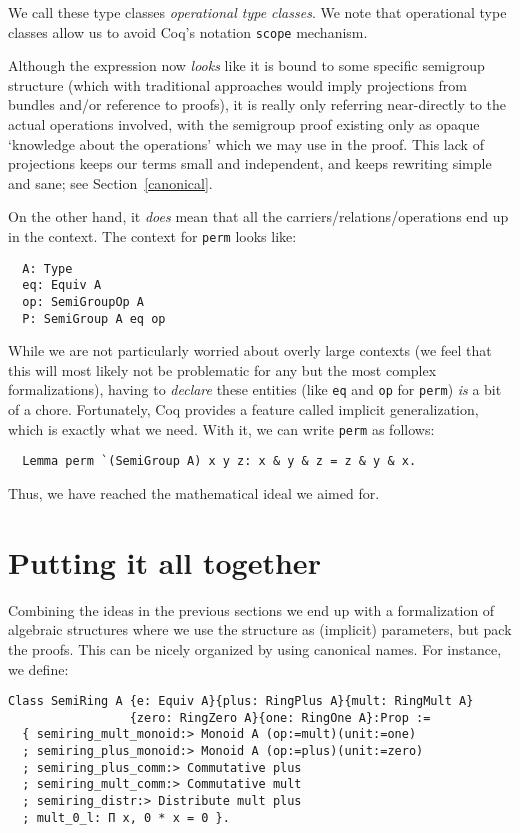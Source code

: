 \documentclass[a4paper,10pt,runningheads]{llncs}
\begin{document}
We call these type classes \emph{operational type classes}. We note that operational type classes
allow us to avoid Coq's notation \lstinline|scope| mechanism.

Although the expression now \emph{looks} like it is bound to some
specific semigroup structure (which with traditional approaches would imply projections from bundles
and/or reference to proofs), it is really only referring near-directly to the actual operations
involved, with the semigroup proof existing only as opaque `knowledge about the operations' which we
may use in the proof. This lack of projections keeps our terms small and independent, and keeps
rewriting simple and sane; see Section~\ref{canonical}.

On the other hand, it \emph{does} mean that all the carriers/relations/operations end up in the
context. The context for \lstinline|perm| looks like:
\begin{lstlisting}
  A: Type
  eq: Equiv A
  op: SemiGroupOp A
  P: SemiGroup A eq op
\end{lstlisting}


While we are not particularly worried about overly large contexts (we feel that this will most
likely not be problematic for any but the most complex formalizations), having to \emph{declare}
these entities (like \lstinline|eq| and \lstinline|op| for \lstinline|perm|) \emph{is} a bit of a chore. Fortunately, Coq provides a feature called implicit generalization, which is exactly what we need.
With it, we can write \lstinline|perm| as follows:
\begin{lstlisting}
  Lemma perm `(SemiGroup A) x y z: x & y & z = z & y & x.
\end{lstlisting}

Thus, we have reached the mathematical ideal we aimed for.

\section{Putting it all together}\label{classes}
Combining the ideas in the previous sections we end up with a formalization of algebraic
structures where we use the structure as (implicit) parameters, but
pack the proofs. This can be nicely organized by using canonical names. For instance, we define:
\begin{lstlisting}
Class SemiRing A {e: Equiv A}{plus: RingPlus A}{mult: RingMult A}
                 {zero: RingZero A}{one: RingOne A}:Prop :=
  { semiring_mult_monoid:> Monoid A (op:=mult)(unit:=one)
  ; semiring_plus_monoid:> Monoid A (op:=plus)(unit:=zero)
  ; semiring_plus_comm:> Commutative plus
  ; semiring_mult_comm:> Commutative mult
  ; semiring_distr:> Distribute mult plus
  ; mult_0_l: Π x, 0 * x = 0 }.
\end{lstlisting}
\end{document}

